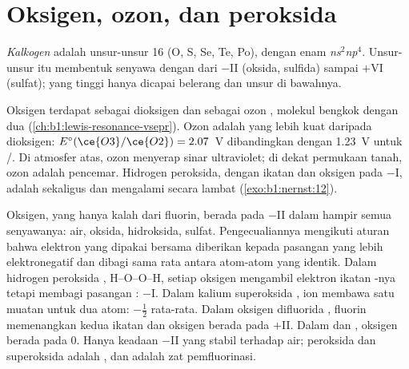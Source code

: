 \section{Oksigen, ozon, dan peroksida}

\begin{definition}[Kalkogen]\label{def:b1:p-block-16-18:chalcogen}
\emph{Kalkogen} adalah unsur-unsur  16 (O, S, Se,
Te, Po), dengan enam  \textit{ns}$^2$\textit{np}$^4$.
Unsur-unsur itu membentuk senyawa dengan  dari $-$II
(oksida, sulfida) sampai $+$VI (sulfat);  yang tinggi
hanya dicapai belerang dan unsur di bawahnya.
\end{definition}

Oksigen terdapat sebagai dioksigen  dan sebagai ozon ,
molekul bengkok dengan dua 
(\cref{ch:b1:lewis-resonance-vsepr}). Ozon adalah  yang lebih
kuat daripada dioksigen: $E^\circ(\ce{O3}/\ce{O2}) = 2.07$~V
dibandingkan dengan 1.23~V untuk /. Di atmosfer atas, ozon
menyerap sinar ultraviolet; di dekat permukaan tanah, ozon adalah
pencemar. Hidrogen peroksida, dengan ikatan  dan oksigen pada
$-$I, adalah  sekaligus  dan mengalami 
secara lambat (\cref{exo:b1:nernst:12}).

\begin{example}
Oksigen, yang  hanya kalah dari fluorin, berada pada
$-$II dalam hampir semua senyawanya: air, oksida, hidroksida, sulfat.
Pengecualiannya mengikuti aturan bahwa elektron yang dipakai bersama
diberikan kepada pasangan yang lebih elektronegatif dan dibagi sama rata
antara atom-atom yang identik. Dalam hidrogen peroksida ,
H--O--O--H, setiap oksigen mengambil elektron ikatan -nya tetapi
membagi pasangan : $-$I. Dalam kalium superoksida , ion
 membawa satu muatan untuk dua atom:
$-\frac12$ rata-rata. Dalam oksigen difluorida , fluorin
memenangkan kedua ikatan dan oksigen berada pada $+$II. Dalam  dan
, oksigen berada pada 0. Hanya keadaan $-$II yang stabil terhadap
air; peroksida dan superoksida adalah , dan  adalah zat
pemfluorinasi.
\end{example}


